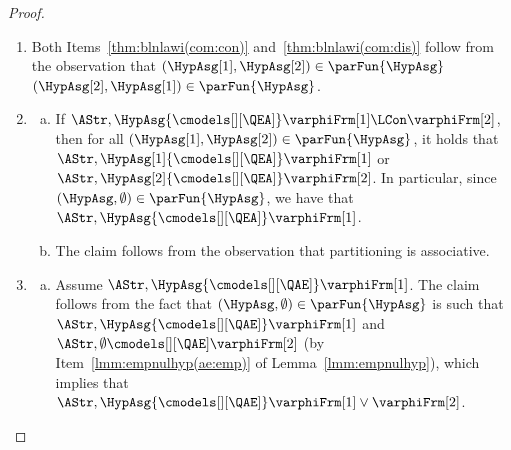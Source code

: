 \documentclass[authoryear]{elsarticle}
\newcommand{\EmpHypAsg}{\emptyset}
\newcommand{\EAmodels}{{\cmodels[][\QEA]}}
\newcommand{\AEmodels}{{\cmodels[][\QAE]}}
\begin{document}
\begin{proof}
\begin{enumerate}[1)]
\begin{enumerate}[a)]
    \item
      First, we prove that $\varphiFrm \vee \Ff \equiv \varphiFrm$ holds.
      To this end, we show that if $\AStr, \HypAsg \AEmodels \varphiFrm \vee
      \Ff$, then $\AStr, \HypAsg \AEmodels \varphiFrm$, and vice versa.
      By semantics, $\AStr, \HypAsg \AEmodels \varphiFrm \vee \Ff$ implies that
      there is $(\HypAsg[1], \HypAsg[2]) \in \parFun{\HypAsg}$ such  that
      $\AStr, \HypAsg[1] \AEmodels \varphiFrm$ and $\AStr, \HypAsg[2] \AEmodels
      \Ff$.
      From the latter, it follows $\HypAsg[2] = \emptyset$, meaning that
      $\HypAsg[1] = \HypAsg$.
      Therefore, we have $\AStr, \HypAsg \AEmodels \varphiFrm$.
      Conversely, assume $\AStr, \HypAsg \AEmodels \varphiFrm$.
      The claim follows from the fact that $(\HypAsg,\EmpHypAsg) \in
      \parFun{\HypAsg}$ is such that $\AStr, \HypAsg \AEmodels \varphiFrm$ and
      $\AStr, \EmpHypAsg \AEmodels \Ff$ (by semantics of $\Ff$), which implies
      that $\AStr, \HypAsg \AEmodels \varphiFrm \vee \Ff$.
      To conclude, observe that $\varphiFrm \vee \Ff \equiv \Ff \vee
      \varphiFrm$ holds, due to commutativity of $\vee$, formally proved below
      (Item~\ref{thm:blnlawi(com:dis)}).
    \end{enumerate}

  \item Both Items~\ref{thm:blnlawi(com:con)} and~\ref{thm:blnlawi(com:dis)}
    follow from the observation that $(\HypAsg[1], \HypAsg[2]) \in
    \parFun{\HypAsg}$ \iff $(\HypAsg[2], \HypAsg[1]) \in \parFun{\HypAsg}$.

  \item
    \begin{enumerate}[a)]
    \item If $\AStr, \HypAsg \EAmodels \varphiFrm[1] \LCon \varphiFrm[2]$,
      then for all $(\HypAsg[1], \HypAsg[2]) \in \parFun{\HypAsg}$, it holds
      that $\AStr, \HypAsg[1] \EAmodels \varphiFrm[1]$ or $\AStr, \HypAsg[2]
      \EAmodels \varphiFrm[2]$.
      In particular, since $(\HypAsg, \EmpHypAsg) \in \parFun{\HypAsg}$, we have
      that $\AStr, \HypAsg \EAmodels \varphiFrm[1]$.

    \item The claim follows from the observation that partitioning is
      associative.
    \end{enumerate}

  \item
    \begin{enumerate}[a)]
    \item Assume $\AStr, \HypAsg \AEmodels \varphiFrm[1]$.
      The claim follows from the fact that $(\HypAsg,\EmpHypAsg) \in
      \parFun{\HypAsg}$ is such that $\AStr, \HypAsg \AEmodels \varphiFrm[1]$
      and $\AStr, \EmpHypAsg \AEmodels \varphiFrm[2]$ (by
      Item~\ref{lmm:empnulhyp(ae:emp)} of Lemma~\ref{lmm:empnulhyp}), which
      implies that $\AStr, \HypAsg \AEmodels \varphiFrm[1] \vee \varphiFrm[2]$.


\end{enumerate}
\end{enumerate}
\end{proof}
\end{document}
